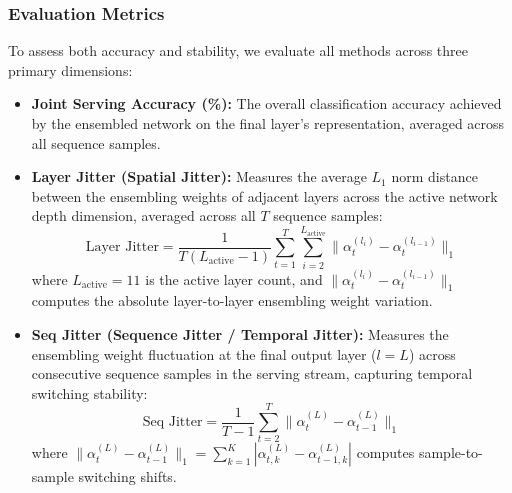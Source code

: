 \subsubsection{Evaluation Metrics}
To assess both accuracy and stability, we evaluate all methods across three primary dimensions:
\begin{itemize}
    \item \textbf{Joint Serving Accuracy (\%):} The overall classification accuracy achieved by the ensembled network on the final layer's representation, averaged across all sequence samples.
    \item \textbf{Layer Jitter (Spatial Jitter):} Measures the average $L_1$ norm distance between the ensembling weights of adjacent layers across the active network depth dimension, averaged across all $T$ sequence samples:
    \begin{equation}
        \text{Layer Jitter} = \frac{1}{T (L_{\text{active}} - 1)} \sum_{t=1}^T \sum_{i=2}^{L_{\text{active}}} \|\alpha^{(l_i)}_t - \alpha^{(l_{i-1})}_t\|_1
    \end{equation}
    where $L_{\text{active}} = 11$ is the active layer count,
    and $\|\alpha^{(l_i)}_t - \alpha^{(l_{i-1})}_t\|_1$ computes the absolute
    layer-to-layer ensembling weight variation.
    \item \textbf{Seq Jitter (Sequence Jitter / Temporal Jitter):} Measures the ensembling weight fluctuation at the final output layer ($l = L$) across consecutive sequence samples in the serving stream, capturing temporal switching stability:
    \begin{equation}
        \text{Seq Jitter} = \frac{1}{T - 1} \sum_{t=2}^T \|\alpha^{(L)}_t - \alpha^{(L)}_{t-1}\|_1
    \end{equation}
    where $\|\alpha^{(L)}_t - \alpha^{(L)}_{t-1}\|_1 = \sum_{k=1}^K |\alpha^{(L)}_{t, k} - \alpha^{(L)}_{t-1, k}|$ computes sample-to-sample switching shifts.
\end{itemize}

